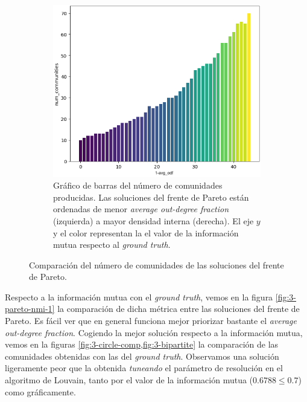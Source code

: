 \begin{figure}[!htb]
\begin{subfigure}{.48\textwidth}
    \includegraphics[width=\linewidth]{img/3_num_communities_pareto_2}
    \caption{Gráfico de barras del número de comunidades producidas. Las
      soluciones del frente de Pareto están ordenadas de menor \emph{average
      out-degree fraction} (izquierda) a mayor densidad interna (derecha). El
      eje \(y\) y el color representan la el valor de la información mutua
      respecto al \emph{ground truth}.}
  \label{fig:3-pareto-num-coms-2}
  \end{subfigure}
  \caption{Comparación del número de comunidades de las soluciones del frente
  de Pareto.}
  \label{fig:3-pareto-num-coms}
\end{figure}

Respecto a la información mutua con el \emph{ground truth}, vemos en la figura
\ref{fig:3-pareto-nmi-1} la comparación de dicha métrica entre las soluciones
del frente de Pareto. Es fácil ver que en general funciona mejor priorizar
bastante el \emph{average out-degree fraction}. Cogiendo la mejor solución
respecto a la información mutua, vemos en la figuras
\ref{fig:3-circle-comp,fig:3-bipartite} la comparación de las comunidades
obtenidas con las del \emph{ground truth}. Observamos una solución ligeramente
peor que la obtenida \emph{tuneando} el parámetro de resolución en el algoritmo
de Louvain, tanto por el valor de la información mutua (\(0.6788 \leq 0.7\))
como gráficamente.

